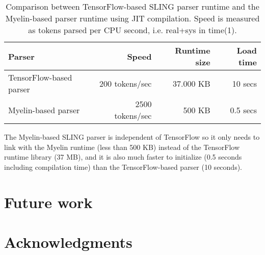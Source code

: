 \documentclass[11pt,a4paper]{article}
\begin{document}
\begin{table*}[!t]
\centering
\begin{tabular}{|l|r|r|r|}
\hline
Parser                  & Speed            & Runtime size & Load time \\
\hline
TensorFlow-based parser &  200 tokens/sec  & 37.000 KB    & 10 secs   \\
Myelin-based parser     & 2500 tokens/sec  &    500 KB    & 0.5 secs  \\
\hline
\end{tabular}
\caption{Comparison between TensorFlow-based SLING parser runtime and the
Myelin-based parser runtime using JIT compilation.
Speed is measured as tokens parsed per CPU second, i.e. real+sys in time(1).}
\label{tab:runtime}
\end{table*}

The Myelin-based SLING parser is independent of TensorFlow so it only needs to
link with the Myelin runtime (less than 500 KB) instead of the TensorFlow
runtime library (37 MB), and it is also much faster to initialize (0.5 seconds
including compilation time) than the TensorFlow-based parser (10 seconds).

\section{Future work}



\section{Acknowledgments}



\end{document}
